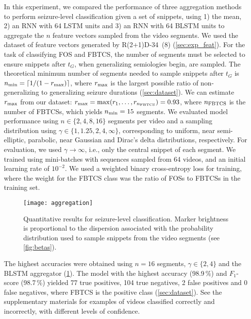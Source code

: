In this experiment, we compared the performance of three aggregation methods to perform seizure-level classification given a set of snippets, using
1) the mean,
2) an \ac{RNN} with 64 \ac{LSTM} units and
3) an \ac{RNN} with 64 \ac{BLSTM} units
to aggregate the $n$ feature vectors sampled from the video segments.
We used the dataset of feature vectors generated by \mbox{R(2+1)D-34 (8)} (\cref{sec:exp_feat}).
For the task of classifying \ac{FOS} and \ac{FBTCS}, the number of segments must be selected to ensure snippets after $t_G$, when generalizing semiologies begin, are sampled.
The theoretical minimum number of segments needed to sample snippets after $t_G$ is $n_{\text{min}} = \lceil 1 / (1 - r_{\text{max}}) \rceil $, where $r_{\text{max}}$ is the largest possible ratio of non-generalizing to generalizing seizure durations (\cref{sec:dataset}).
We can estimate $r_{\text{max}}$ from our dataset: $r_{\text{max}} = \max ( r_1, \dots, r_{n_{\text{FBTCS}}} ) = 0.93$, where $n_{\text{FBTCS}}$ is the number of \acp{FBTCS}, which yields $n_{\text{min}} = 15$ segments.
We evaluated model performance using $n \in \{2, 4, 8, 16\}$ segments per video and a sampling distribution using $\gamma \in \{ 1, 1.25, 2, 4, \infty \}$, corresponding to uniform, near semi-elliptic, parabolic, near Gaussian and Dirac's delta distributions, respectively.
For evaluation, we used $\gamma \rightarrow \infty$, i.e., only the central snippet of each segment.
We trained using mini-batches with sequences sampled from 64 videos, and an initial learning rate of $10 ^ {-2}$.
We used a weighted binary cross-entropy loss for training, where the weight for the \ac{FBTCS} class was the ratio of \acp{FOS} to \acp{FBTCS} in the training set.


\begin{figure}
  \centering
  \texttt{[image: aggregation]}
  \caption[Quantitative results for seizure-level classification]{
    Quantitative results for seizure-level classification.
    Marker brightness is proportional to the dispersion associated with the probability distribution used to sample snippets from the video segments (see \cref{fig:betas}).
  }
  \label{fig:aggregation}
\end{figure}

The highest accuracies were obtained using $n = 16$ segments, $\gamma \in \{ 2, 4 \}$ and the \ac{BLSTM} aggregator (\cref{fig:aggregation}).
The model with the highest accuracy (98.9\,\%) and $F_1$-score (98.7\,\%) yielded 77 true positives, 104 true negatives, 2 false positives and 0 false negatives, where \ac{FBTCS} is the positive class (\cref{sec:dataset}).
See the supplementary materials%
for examples of videos classified correctly and incorrectly, with different levels of confidence.
